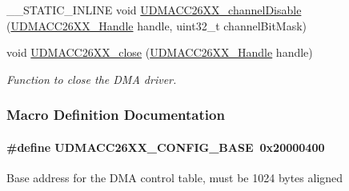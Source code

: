 \begin{DoxyCompactItemize}
\item 
\-\_\-\-\_\-\-S\-T\-A\-T\-I\-C\-\_\-\-I\-N\-L\-I\-N\-E void \hyperlink{_u_d_m_a_c_c26_x_x_8h_a0cd214fa0e13f1ddb1a519a30acfe30c}{U\-D\-M\-A\-C\-C26\-X\-X\-\_\-channel\-Disable} (\hyperlink{_u_d_m_a_c_c26_x_x_8h_a969a9feb0f822c4764ef1da2ff5066cf}{U\-D\-M\-A\-C\-C26\-X\-X\-\_\-\-Handle} handle, uint32\-\_\-t channel\-Bit\-Mask)
\item 
void \hyperlink{_u_d_m_a_c_c26_x_x_8h_a5529a47329f27d70c490c5ed1c1b19f0}{U\-D\-M\-A\-C\-C26\-X\-X\-\_\-close} (\hyperlink{_u_d_m_a_c_c26_x_x_8h_a969a9feb0f822c4764ef1da2ff5066cf}{U\-D\-M\-A\-C\-C26\-X\-X\-\_\-\-Handle} handle)
\begin{DoxyCompactList}\small\item\em Function to close the D\-M\-A driver. \end{DoxyCompactList}\end{DoxyCompactItemize}


\subsubsection{Macro Definition Documentation}
\paragraph[{U\-D\-M\-A\-C\-C26\-X\-X\-\_\-\-C\-O\-N\-F\-I\-G\-\_\-\-B\-A\-S\-E}]{\setlength{\rightskip}{0pt plus 5cm}\#define U\-D\-M\-A\-C\-C26\-X\-X\-\_\-\-C\-O\-N\-F\-I\-G\-\_\-\-B\-A\-S\-E~0x20000400}\label{_u_d_m_a_c_c26_x_x_8h_ab956c64f89045e5c6546115ec6062a7f}
Base address for the D\-M\-A control table, must be 1024 bytes aligned 
